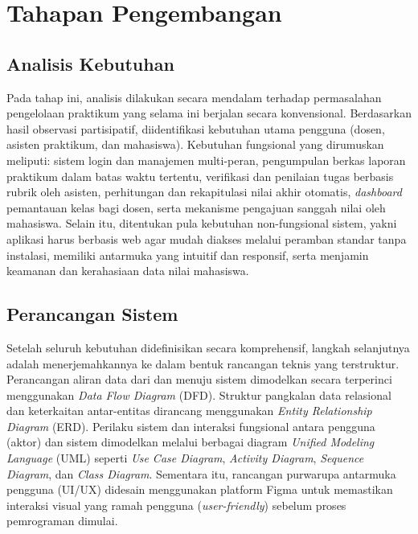 \documentclass[12pt,a4paper,twoside]{report}
\begin{document}
\section{Tahapan Pengembangan}

\subsection{Analisis Kebutuhan}
Pada tahap ini, analisis dilakukan secara mendalam terhadap permasalahan pengelolaan praktikum yang selama ini berjalan secara konvensional. Berdasarkan hasil observasi partisipatif, diidentifikasi kebutuhan utama pengguna (dosen, asisten praktikum, dan mahasiswa). Kebutuhan fungsional yang dirumuskan meliputi: sistem login dan manajemen multi-peran, pengumpulan berkas laporan praktikum dalam batas waktu tertentu, verifikasi dan penilaian tugas berbasis rubrik oleh asisten, perhitungan dan rekapitulasi nilai akhir otomatis, \textit{dashboard} pemantauan kelas bagi dosen, serta mekanisme pengajuan sanggah nilai oleh mahasiswa. Selain itu, ditentukan pula kebutuhan non-fungsional sistem, yakni aplikasi harus berbasis web agar mudah diakses melalui peramban standar tanpa instalasi, memiliki antarmuka yang intuitif dan responsif, serta menjamin keamanan dan kerahasiaan data nilai mahasiswa.

\subsection{Perancangan Sistem}
Setelah seluruh kebutuhan didefinisikan secara komprehensif, langkah selanjutnya adalah menerjemahkannya ke dalam bentuk rancangan teknis yang terstruktur. Perancangan aliran data dari dan menuju sistem dimodelkan secara terperinci menggunakan \textit{Data Flow Diagram} (DFD). Struktur pangkalan data relasional dan keterkaitan antar-entitas dirancang menggunakan \textit{Entity Relationship Diagram} (ERD). Perilaku sistem dan interaksi fungsional antara pengguna (aktor) dan sistem dimodelkan melalui berbagai diagram \textit{Unified Modeling Language} (UML) seperti \textit{Use Case Diagram}, \textit{Activity Diagram}, \textit{Sequence Diagram}, dan \textit{Class Diagram}. Sementara itu, rancangan purwarupa antarmuka pengguna (UI/UX) didesain menggunakan platform Figma untuk memastikan interaksi visual yang ramah pengguna (\textit{user-friendly}) sebelum proses pemrograman dimulai.
\end{document}
